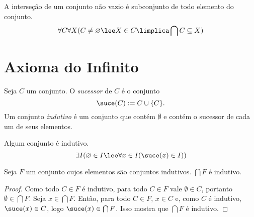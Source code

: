 \begin{prop}
A interseção de um conjunto não vazio é subconjunto de todo elemento do conjunto.
	\begin{equation*}
	\forall C \forall X(C \neq \emptyset \lee X \in C \limplica \bigcap C \subseteq X)
	\end{equation*}
\end{prop}

\section{Axioma do Infinito}

\begin{defi}
Seja $C$ um conjunto. O \emph{sucessor} de $C$ é o conjunto
	\begin{equation*}
	\suce(C) := C \cup \{C\}.
	\end{equation*}
Um conjunto \emph{indutivo} é um conjunto que contém $\emptyset$ e contém o sucessor de cada um de seus elementos.
\end{defi}

\begin{axi}
Algum conjunto é indutivo.
	\begin{equation*}
	\exists I(\emptyset \in I \lee \forall x \in I(\suce(x) \in I))
	\end{equation*}
\end{axi}

\begin{prop}
Seja $F$ um conjunto cujos elementos são conjuntos indutivos. $\bigcap F$ é indutivo.
\end{prop}
\begin{proof}
Como todo $C \in F$ é indutivo, para todo $C \in F$ vale $\emptyset \in C$, portanto $\emptyset \in \bigcap F$. Seja $x \in \bigcap F$. Então, para todo $C \in F$, $x \in C$ e, como $C$ é indutivo, $\suce(x) \in C$, logo $\suce(x) \in \bigcap F$. Isso mostra que $\bigcap F$ é indutivo.
\end{proof}


